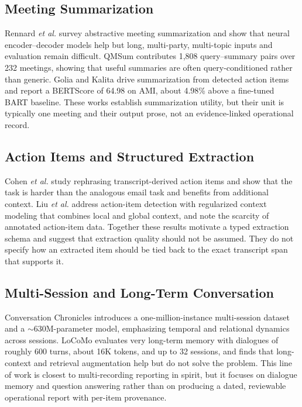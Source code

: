 \documentclass[conference,a4paper]{IEEEtran}
\newcommand{\etal}{\textit{et al.}}
\begin{document}
\subsection{Meeting Summarization}

Rennard \etal \cite{rennard2023abstractive} survey abstractive meeting summarization and
show that neural encoder--decoder models help but long, multi-party, multi-topic inputs and
evaluation remain difficult. QMSum \cite{zhong2021qmsum} contributes 1,808 query--summary
pairs over 232 meetings, showing that useful summaries are often query-conditioned rather
than generic. Golia and Kalita \cite{golia2023action} drive summarization from detected
action items and report a BERTScore of 64.98 on AMI, about 4.98\% above a fine-tuned BART
baseline. These works establish summarization utility, but their unit is typically one
meeting and their output prose, not an evidence-linked operational record.

\subsection{Action Items and Structured Extraction}

Cohen \etal \cite{cohen2021rephrasing} study rephrasing transcript-derived action items
and show that the task is harder than the analogous email task and benefits from
additional context. Liu \etal \cite{liu2023action} address action-item detection with
regularized context modeling that combines local and global context, and note the scarcity
of annotated action-item data. Together these results motivate a typed extraction schema
and suggest that extraction quality should not be assumed. They do not specify how an
extracted item should be tied back to the exact transcript span that supports it.

\subsection{Multi-Session and Long-Term Conversation}

Conversation Chronicles \cite{jang2023conversation} introduces a one-million-instance
multi-session dataset and a $\sim$630M-parameter model, emphasizing temporal and relational
dynamics across sessions. LoCoMo \cite{maharana2024locomo} evaluates very long-term memory
with dialogues of roughly 600 turns, about 16K tokens, and up to 32 sessions, and finds
that long-context and retrieval augmentation help but do not solve the problem. This line
of work is closest to multi-recording reporting in spirit, but it focuses on dialogue
memory and question answering rather than on producing a dated, reviewable operational
report with per-item provenance.
\end{document}
